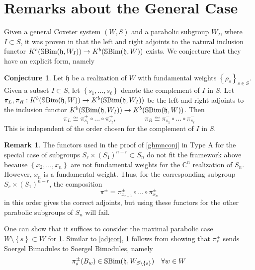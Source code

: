 \documentclass[10pt]{article}
\numberwithin{theorem}{section}
\theoremstyle{definition}
\newtheorem*{remark}{Remark}
\newtheorem{conjecture}{Conjecture}
\newcommand{\hf}{\mathfrak{h}}
\newcommand{\Cb}{\mathbb{C}}
\newcommand{\sbim}{\mathbb{S}\textnormal{Bim}}
\newcommand{\set}[1]{\left \{ #1 \right \}}
\newcommand{\0}{\ \raisebox{-2ex}{\begin{tikzpicture}[xscale=0.25,yscale=0.3,thick,baseline]
 \draw (0,0) -- (0,3); 
\end{tikzpicture}}}
\renewcommand{\1}{\ \raisebox{-2ex}{\begin{tikzpicture}[xscale=0.25,yscale=0.3,thick,baseline]
 \draw (0,0) -- (0,1);
 \draw (0,2) -- (0,3);
 \node[dot] at (0,1) {};
  \node[dot] at (0,2) {};
\end{tikzpicture}}}
\begin{document}
\section{Remarks about the General Case}
\label{gensect}

Given a general Coxeter system $(W, S)$ and a parabolic subgroup $W_I$, where $I\subset S$, it was proven in \cite[Appendix A]{GHMN19} that the left and right adjoints to the natural inclusion functor $K^b(\sbim(\hf, W_I))\to K^b(\sbim(\hf, W))$ exists. We conjecture that they have an explicit form, namely

\begin{conjecture}
\label{conj2}
    Let $\hf$ be a realization of $W$ with fundamental weights $\set{\rho_s}_{s\in S}$. Given a subset $I\subset S$, let $\set{s_1, \ldots, s_\ell}$ denote the complement of $I$ in $S$. Let $\pi_L, \pi_R:K^b(\sbim(\hf, W))\to  K^b(\sbim(\hf, W_I))$ be the left and right adjoints to the inclusion functor $K^b(\sbim(\hf, W_I))\to K^b(\sbim(\hf, W))$. Then 
    \[ \pi_L\cong \pi^+_{s_1}\circ \ldots \circ \pi^+_{s_\ell} , \qquad \qquad  \pi_R\cong \pi^-_{s_1}\circ \ldots \circ \pi^-_{s_\ell}  \]
   This is independent of the order chosen for the complement of $I$ in $S$.
\end{conjecture}

\begin{remark}
   The functors used in the proof of \cref{ghmnconj} in Type A for the special case of subgroups $S_r\times (S_1)^{n-r}\subset S_n$ do not fit the framework above because $\set{x_2, \ldots, x_n}$ are not fundamental weights for the $\Cb^n$ realization of $S_n$. However, $x_n$ is a fundamental weight. Thus, for the corresponding subgroup $S_r\times (S_1)^{n-r}$, the composition $$\pi^{\pm}=\pi^{\pm}_{x_{r+1}}\circ \ldots \circ \pi^{\pm}_{x_n}$$ 
   in this order gives the correct adjoints, but using these functors for the other parabolic subgroups of $S_n$ will fail.
\end{remark}

One can show that it suffices to consider the maximal parabolic case $W\setminus\set{s}\subset W$ for \cref{conj2}. Similar to \cref{adjcor}, \cref{conj2} follows from showing that $\pi^{\pm}_s$ sends Soergel Bimodules to Soergel Bimodules, namely
\begin{equation}
\label{pisbimeq}
    \pi^{\pm}_s(B_w)\in \sbim(\hf, W_{S\setminus \set{s}}) \quad \forall w\in W
\end{equation}
\end{document}
